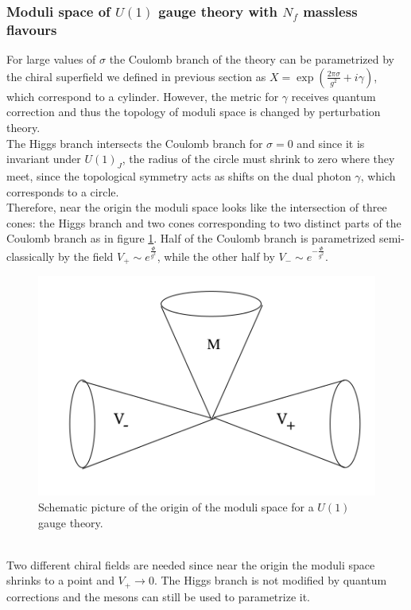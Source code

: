 \subsubsection{Moduli space of $U(1)$ gauge theory with $N_f$ massless flavours }
For large values of $\sigma$ the Coulomb branch of the theory can be parametrized by the chiral superfield we defined in previous section as $X = \exp{ \left( \frac{ 2 \pi \sigma}{g^2} + i \gamma  \right) } $, which correspond to a cylinder.
However, the metric for $\gamma$ receives quantum correction and thus the topology of moduli space is changed by perturbation theory.\\
The Higgs branch intersects the Coulomb branch for $\sigma=0$ and since it is invariant under $U(1)_J$, the radius of the circle must shrink to zero where they meet, since the topological symmetry acts as shifts on the dual photon $\gamma$, which corresponds to a circle.
\\
Therefore, near the origin the moduli space looks like the intersection of three cones: the Higgs branch and two cones corresponding to two distinct parts of the Coulomb branch as in figure \ref{fig:u1_origin_cones}.
Half of the Coulomb branch is parametrized semi-classically by the field $V_+ \sim e^{\frac{\Phi}{g^2}}$, while the other half by $V_- \sim e^{ -\frac{\Phi}{g^2} }$. 
\begin{figure}[ht]
\centering
\includegraphics[scale=0.38]{u1_threecones.png}
\caption{Schematic picture of the origin of the moduli space for a $U(1)$ gauge theory.}
\label{fig:u1_origin_cones}
\end{figure}	
\\
Two different chiral fields are needed since near the origin the moduli space shrinks to a point and $V_+ \rightarrow 0$. 
The Higgs branch is not modified by quantum corrections and the mesons can still be used to parametrize it.\\
